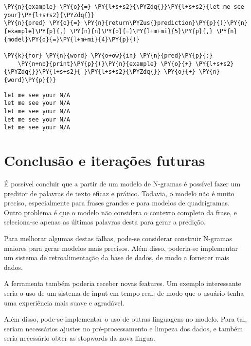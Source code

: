 \documentclass[a4paper,11pt,final]{article}
\begin{document}
\begin{Verbatim}[commandchars=\\\{\},frame=single,fontsize=\small, xleftmargin=0.5em]
\PY{n}{example} \PY{o}{=} \PY{l+s+s2}{\PYZdq{}}\PY{l+s+s2}{let me see your}\PY{l+s+s2}{\PYZdq{}}
\PY{n}{pred} \PY{o}{=} \PY{n}{return\PYZus{}prediction}\PY{p}{(}\PY{n}{example}\PY{p}{,} \PY{n}{n}\PY{o}{=}\PY{l+m+mi}{5}\PY{p}{,} \PY{n}{model}\PY{o}{=}\PY{l+m+mi}{4}\PY{p}{)}

\PY{k}{for} \PY{n}{word} \PY{o+ow}{in} \PY{n}{pred}\PY{p}{:}
    \PY{n+nb}{print}\PY{p}{(}\PY{n}{example} \PY{o}{+} \PY{l+s+s2}{\PYZdq{}}\PY{l+s+s2}{ }\PY{l+s+s2}{\PYZdq{}} \PY{o}{+} \PY{n}{word}\PY{p}{)}
\end{Verbatim}

\begin{Verbatim}[commandchars=\\\{\},frame=leftline,fontsize=\small, xleftmargin=0.5em]
let me see your N/A
let me see your N/A
let me see your N/A
let me see your N/A
let me see your N/A
\end{Verbatim}


\section{Conclusão e iterações futuras}

É possível concluir que a partir de um modelo de N-gramas é possível fazer um preditor de palavras de texto eficaz e prático.
Todavia, o modelo não é muito preciso, especialmente para frases grandes e para modelos de quadrigramas. 
Outro problema é que o modelo não considera o contexto completo da frase, e seleciona-se apenas as últimas palavras desta para gerar a predição.

Para melhorar algumas destas falhas, pode-se considerar construir N-gramas maiores para gerar modelos mais precisos.
Além disso, poderia-se implementar um sistema de retroalimentação da base de dados, de modo a fornecer mais dados.

A ferramenta também poderia receber novas features. Um exemplo interessante seria o uso de um sistema de input em tempo real, de modo que o usuário tenha uma experiência mais suave e agradável.

Além disso, pode-se implementar o uso de outras linguagens no modelo. 
Para tal, seriam necessários ajustes no pré-processamento e limpeza dos dados, e também seria necessário obter as stopwords da nova língua.
\end{document}
